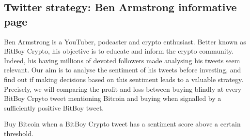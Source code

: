 \documentclass[twoside]{report}
\begin{document}
\begin{spacing}{1}
\subsection{Twitter strategy: Ben Armstrong informative page}
Ben Armstrong is a YouTuber, podcaster and crypto enthusiast. Better known as BitBoy Crypto, his objective is to educate and inform the crypto community. Indeed, his having millions of devoted followers made analysing his tweets seem relevant. Our aim is to analyse the sentiment of his tweets before investing, and find out if making decisions based on this sentiment leads to a valuable strategy. Precisely, we will comparing the profit and loss between buying blindly at every BitBoy Crpyto tweet mentioning Bitcoin and buying when signalled by a sufficiently positive BitBoy tweet. 
\begin{strategy}
Buy Bitcoin when a BitBoy Crypto tweet has a sentiment score above a certain threshold.  
\end{strategy}\label{strat:sent} 
\begin{figure}[!h]
\begin{minipage}{.5\linewidth}
\centering
{}
\end{minipage}%
\begin{minipage}{.5\linewidth}
\centering

\end{minipage}
\end{figure}
\end{spacing}
\end{document}
